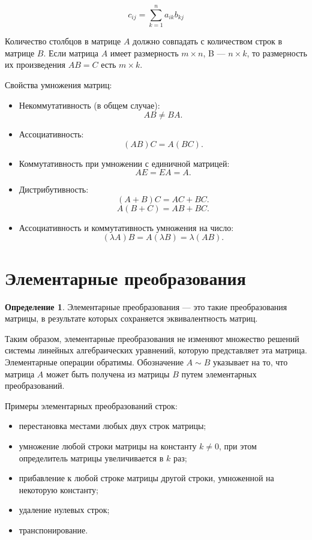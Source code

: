 \documentclass[a5paper, 11pt]{extbook}
\theoremstyle{definition}
\theoremstyle{definition}
\newtheorem{definition}{Определение}[section]
\theoremstyle{definition}
\begin{document}
\begin{equation*}
    c_{ij} = \sum_{k=1}^n a_{ik} b_{kj}
\end{equation*}

Количество столбцов в матрице \(A\) должно совпадать с количеством строк в матрице \(B\). Если матрица \(A\) имеет размерность \(m \times n\), B — \(n \times k\), то размерность их произведения \(AB = C\) есть \(m \times k\).

Свойства умножения матриц:
\begin{itemize}
    \item Некоммутативность (в общем случае):
          \[
              AB \neq BA.
          \]
    \item Ассоциативность:
          \[
              (AB)C = A(BC).
          \]
    \item Коммутативность при умножении с единичной матрицей:
          \[
              AE = EA = A.
          \]
    \item Дистрибутивность:
          \[
              (A + B) C = AC + BC.
          \]
          \[
              A (B + C) = AB + BC.
          \]
    \item Ассоциативность и коммутативность умножения на число:
          \[
              (\lambda A) B = A (\lambda B) = \lambda (AB).
          \]
\end{itemize}

\section{Элементарные преобразования}
\label{sec:org11b71ac}
\begin{definition}
    Элементарные преобразования — это такие преобразования матрицы, в результате которых сохраняется эквивалентность матриц.
\end{definition}

Таким образом, элементарные преобразования не изменяют множество решений системы линейных алгебраических уравнений, которую представляет эта матрица. Элементарные операции обратимы. Обозначение \(A \sim B\) указывает на то, что матрица \(A\) может быть получена из матрицы \(B\) путем элементарных преобразований.

Примеры элементарных преобразований строк:
\begin{itemize}
    \item перестановка местами любых двух строк матрицы;
    \item умножение любой строки матрицы на константу \(k \neq 0\), при этом определитель матрицы увеличивается в \(k\) раз;
    \item прибавление к любой строке матрицы другой строки, умноженной на некоторую константу;
    \item удаление нулевых строк;
    \item транспонирование.
\end{itemize}
\end{document}
